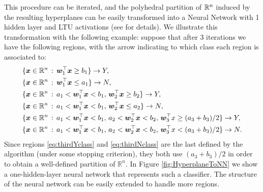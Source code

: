 %
This procedure can be iterated, and the polyhedral partition of $\mathbb{R}^n$ induced by the resulting hyperplanes can be easily transformed into a Neural Network with 1 hidden layer and LTU activations (see \cite{bennett1990neural} for details). We illustrate this transformation with the following example: suppose that after 3 iterations we have the following regions, with the arrow indicating to which class each region is associated to:
%
\begin{subequations}\label{eq:hyperplanestoNN}
\begin{align}
&\{{\bm{x}}\in \mathbb{R}^n \,: \, {\bm{w}}_1^\top {\bm{x}} \geq b_1 \} \to Y, \label{eq:firstYclass}\\
&\{{\bm{x}}\in \mathbb{R}^n \,: \, {\bm{w}}_1^\top {\bm{x}} \leq a_1 \} \to N , \label{eq:firstNclass}\\
&\{{\bm{x}}\in \mathbb{R}^n \,: \, a_1 < {\bm{w}}_1^\top {\bm{x}} < b_1,\,  {\bm{w}}_2^\top {\bm{x}} \geq b_2  \}\to Y, \label{eq:secondYclass}\\
&\{{\bm{x}}\in \mathbb{R}^n \,: \, a_1 < {\bm{w}}_1^\top {\bm{x}} < b_1,\,  {\bm{w}}_2^\top {\bm{x}} \leq a_2  \}\to N, \label{eq:secondNclass}\\
&\{{\bm{x}}\in \mathbb{R}^n \,: \, a_1 < {\bm{w}}_1^\top {\bm{x}} < b_1,\,  a_2 < {\bm{w}}_2^\top {\bm{x}} < b_2,\, {\bm{w}}_3^\top x \geq (a_3 + b_3)/2 \} \to Y, \label{eq:thirdYclass}\\
&\{{\bm{x}}\in \mathbb{R}^n \,: \, a_1 < {\bm{w}}_1^\top {\bm{x}} < b_1,\,  a_2 < {\bm{w}}_2^\top {\bm{x}} < b_2,\, {\bm{w}}_3^\top x < (a_3 + b_3)/2 \} \to N \label{eq:thirdNclass}.
\end{align}
\end{subequations}
Since regions \eqref{eq:thirdYclass} and \eqref{eq:thirdNclass} are the last defined by the algorithm (under some stopping criterion), they both use $(a_3 + b_3)/2$ in order to obtain a well-defined partition of $\mathbb{R}^n$. In Figure \ref{fig:HyperplaneToNN} we show a one-hidden-layer neural network that represents such a classifier. The structure of the neural network can be easily extended to handle more regions.
%
